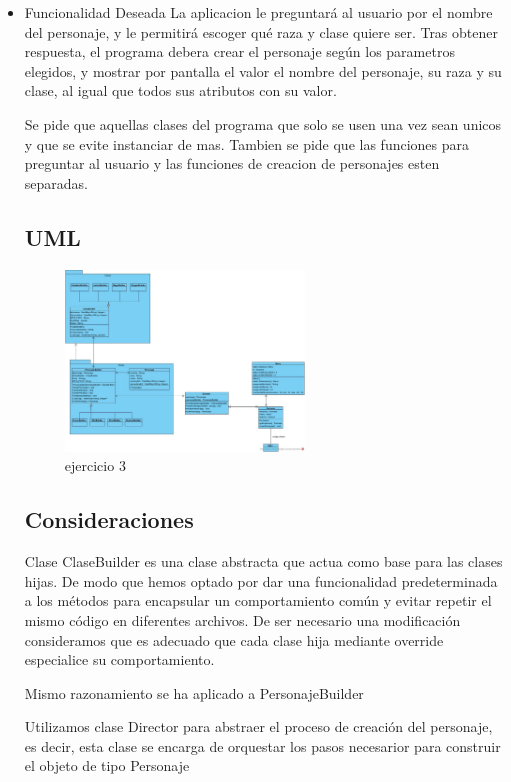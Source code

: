 \documentclass{article}
\begin{document}
\begin{itemize}
\item Funcionalidad Deseada
La aplicacion le preguntará al usuario por el nombre del personaje, y le permitirá escoger qué raza y clase quiere ser.
Tras obtener respuesta, el programa debera crear el personaje según los parametros elegidos, y mostrar por pantalla el valor
el nombre del personaje, su raza y su clase, al igual que todos sus atributos con su valor.

Se pide que aquellas clases del programa que solo se usen una vez sean unicos y que se evite instanciar de mas.
Tambien se pide que las funciones para preguntar al usuario y las funciones de creacion de personajes esten separadas.

\subsection{UML}

\begin{figure}[h]
	\centering
        \vspace{15pt}
	\includegraphics[width=0.6\textwidth]{DS_ej3.jpg}
	\caption{ejercicio 3}
	\label{fig:ej3}
\end{figure}


\subsection{Consideraciones}
Clase ClaseBuilder es una clase abstracta que actua como base para las clases hijas. De modo que hemos optado por dar una funcionalidad 
predeterminada a los métodos para encapsular un comportamiento común y evitar repetir el mismo código en diferentes archivos. De ser necesario una modificación consideramos
que es adecuado que cada clase hija mediante override especialice su comportamiento.

Mismo razonamiento se ha aplicado a PersonajeBuilder

Utilizamos clase Director para abstraer el proceso de creación del personaje, es decir, esta clase se encarga de orquestar los pasos necesarior para construir el objeto de tipo Personaje 


\end{itemize}
\end{document}
